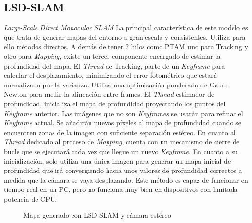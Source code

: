 \subsection{LSD-SLAM} 
\textit {Large-Scale Direct Monocular SLAM}
La principal característica de este modelo es que trata de generar mapas del entorno a gran escala y consistentes.
Utiliza para ello métodos directos. A demás de tener 2 hilos como PTAM uno para Tracking y otro para \textit{Mapping}, existe un tercer componente encargado de estimar la profundidad del mapa.\cite{Engel2014lsd}
El \textit{Thread} de Tracking, parte de un \textit{Keyframe}  para calcular el desplazamiento, minimizando el error fotométrico que estará normalizado por la varianza. Utiliza una optimización ponderada de Gauss-Newton para medir la alineación entre frames.
El \textit{Thread} estimador de profundidad, inicializa el mapa de profundidad proyectando los puntos del \textit{Keyframe} anterior. Las imágenes que no son \textit{Keyframes} se usarán para refinar el \textit{Keyframe} actual. Se añadirán nuevos píxeles al mapa de profundidad cuando se encuentren zonas de la imagen con suficiente separación estéreo.
En cuanto al \textit{Thread} dedicado al proceso de \textit{Mapping}, cuenta con un mecanismo de cierre de bucle que se ejecutará cada vez que llegue un nuevo \textit{Keyframe}. En cuanto a su inicialización, solo utiliza una única imagen para generar un mapa inicial de profundidad que irá convergiendo hacia unos valores de profundidad correctos a medida que la cámara se vaya desplazando.
Este método es capaz de funcionar en tiempo real en un PC, pero  no funciona muy bien en dispositivos con limitada potencia de CPU.

\begin{figure}[H]
\begin{center}
\end{center}
\caption{Mapa generado con LSD-SLAM y cámara estéreo}
\end{figure}

